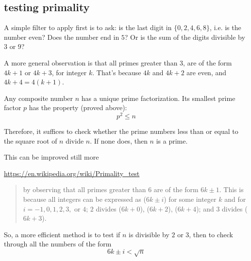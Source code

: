 \documentclass[11pt, oneside]{article}
\begin{document}
\subsection*{testing primality}

A simple filter to apply first is to ask:  is the last digit in $\{ 0,2,4,6,8 \}$, i.e. is the number even?  Does the number end in $5$?  Or is the sum of the digits divisible by $3$ or $9$?

A more general observation is that all primes greater than $3$, are of the form $4k + 1$ or $4k + 3$, for integer $k$.  That's because $4k$ and $4k + 2$ are even, and $4k + 4 = 4(k + 1)$.

Any composite number $n$ has a unique prime factorization.  Its smallest prime factor $p$ has the property (proved above):
\[ p^2 \le n \]

Therefore, it suffices to check whether the prime numbers less than or equal to the square root of $n$ divide $n$.  If none does, then $n$ is a prime.

This can be improved still more

\url{https://en.wikipedia.org/wiki/Primality_test}

\begin{quote}by observing that all primes greater than $6$ are of the form $6k \pm 1$. This is because all integers can be expressed as ($6k \pm i$) for some integer $k$ and for $i = -1, 0, 1, 2, 3,$ or $4$; $2$ divides ($6k + 0$), ($6k + 2$), ($6k + 4$); and $3$ divides ($6k + 3$).\end{quote}

So, a more efficient method is to test if $n$ is divisible by $2$ or $3$, then to check through all the numbers of the form 
\[ 6k \pm i < \sqrt{n} \]
\end{document}
